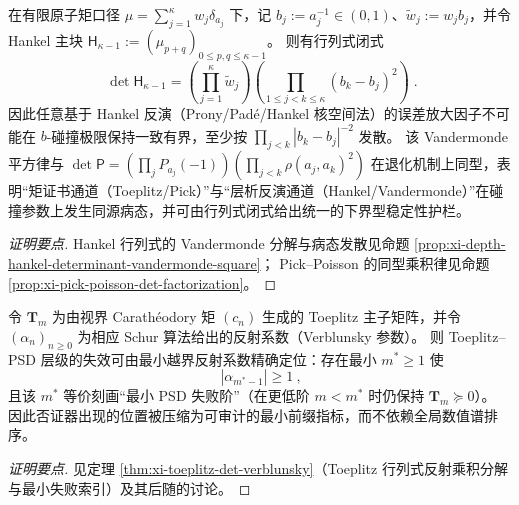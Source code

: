 \begin{conclusion}\label{con:xi-terminal-hankel-toeplitz-common-illconditioning}
在有限原子矩口径 \(\mu=\sum_{j=1}^{\kappa}w_j\delta_{a_j}\) 下，记 \(b_j:=a_j^{-1}\in(0,1)\)、\(\widetilde w_j:=w_j b_j\)，并令 Hankel 主块 \(\mathsf H_{\kappa-1}:=(\mu_{p+q})_{0\le p,q\le \kappa-1}\)。
则有行列式闭式
\[
\boxed{\;
\det \mathsf H_{\kappa-1}
=\left(\prod_{j=1}^{\kappa}\widetilde w_j\right)
\left(\prod_{1\le j<k\le \kappa}(b_k-b_j)^2\right)\; }.
\]
因此任意基于 Hankel 反演（Prony/Pad\'e/Hankel 核空间法）的误差放大因子不可能在 \(b\)-碰撞极限保持一致有界，至少按 \(\prod_{j<k}|b_k-b_j|^{-2}\) 发散。
该 Vandermonde 平方律与
\(
\det\mathsf P=(\prod_j P_{a_j}(-1))(\prod_{j<k}\rho(a_j,a_k)^2)
\)
在退化机制上同型，表明“矩证书通道（Toeplitz/Pick）”与“层析反演通道（Hankel/Vandermonde）”在碰撞参数上发生同源病态，并可由行列式闭式给出统一的下界型稳定性护栏。
\end{conclusion}
\begin{proof}[证明要点]
Hankel 行列式的 Vandermonde 分解与病态发散见命题 \ref{prop:xi-depth-hankel-determinant-vandermonde-square}；
Pick--Poisson 的同型乘积律见命题 \ref{prop:xi-pick-poisson-det-factorization}。
\end{proof}












\begin{conclusion}\label{con:xi-terminal-toeplitz-psd-failure-cmv-prefix}
令 \(\mathbf{T}_m\) 为由视界 Carath\'eodory 矩 \((c_n)\) 生成的 Toeplitz 主子矩阵，并令 \((\alpha_n)_{n\ge 0}\) 为相应 Schur 算法给出的反射系数（Verblunsky 参数）。
则 Toeplitz--PSD 层级的失效可由最小越界反射系数精确定位：存在最小 \(m^\ast\ge 1\) 使
\[
\boxed{\ |\alpha_{m^\ast-1}|\ge 1\ },
\]
且该 \(m^\ast\) 等价刻画“最小 PSD 失败阶”（在更低阶 \(m<m^\ast\) 时仍保持 \(\mathbf{T}_m\succeq 0\)）。
因此否证器出现的位置被压缩为可审计的最小前缀指标，而不依赖全局数值谱排序。
\end{conclusion}
\begin{proof}[证明要点]
见定理 \ref{thm:xi-toeplitz-det-verblunsky}（Toeplitz 行列式反射乘积分解与最小失败索引）及其后随的讨论。
\end{proof}

